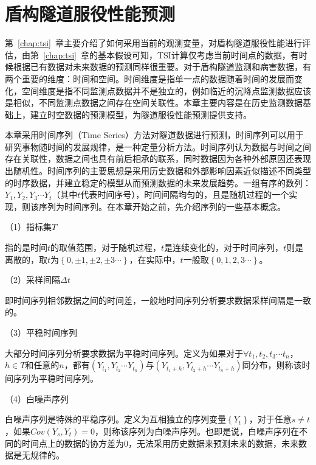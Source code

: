 \chapter{盾构隧道服役性能预测}
\label{chap:prediction}

第~\ref{chap:tsi}~章主要介绍了如何采用当前的观测变量，对盾构隧道服役性能进行评估，由第~\ref{chap:tsi}~章的基本假设可知，TSI计算仅考虑当前时间点的数据，有时候根据已有数据对未来数据的预测同样很重要。对于盾构隧道监测和病害数据，有两个重要的维度：时间和空间。时间维度是指单一点的数据随着时间的发展而变化，空间维度是指不同监测点数据并不是独立的，例如临近的沉降点监测数据应该是相似，不同监测点数据之间存在空间关联性。本章主要内容是在历史监测数据基础上，建立时空数据的预测模型，为隧道服役性能预测提供支持。

本章采用时间序列（Time Series）方法对隧道数据进行预测，时间序列可以用于研究事物随时间的发展规律，是一种定量分析方法。时间序列认为数据与时间之间存在关联性，数据之间也具有前后相承的联系，同时数据因为各种外部原因还表现出随机性。时间序列的主要思想是采用历史数据和外部影响因素近似描述不同类型的时序数据，并建立稳定的模型从而预测数据的未来发展趋势。一组有序的数列：${{Y}_{1}},{{Y}_{2}},{{Y}_{3}}\cdots {{Y}_{t}}$（其中$t$代表时间序号），时间间隔均匀的，且是随机过程的一个实现，则该序列为时间序列。在本章开始之前，先介绍序列的一些基本概念。

（1）指标集$T$

指的是时间$t$的取值范围，对于随机过程，$t$是连续变化的，对于时间序列，$t$则是离散的，取$t$为$\left\{ 0,\pm 1,\pm 2,\pm 3\cdots  \right\}$，在实际中，$t$一般取$\left\{ 0,1,2,3\cdots  \right\}$。

（2）采样间隔$\Delta t$

即时间序列相邻数据之间的时间差，一般地时间序列分析要求数据采样间隔是一致的。

（3）平稳时间序列

大部分时间序列分析要求数据为平稳时间序列。定义为如果对于$\forall {{t}_{1}},{{t}_{2}},{{t}_{3}}\cdots {{t}_{n}}$，$h\in T$和任意的$n$，都有$\left( {{Y}_{{{t}_{1}}}},{{Y}_{{{t}_{2}}}}\cdots {{Y}_{{{t}_{n}}}} \right)$与$\left( {{Y}_{{{t}_{1}}+h}},{{Y}_{{{t}_{2}}+h}}\cdots {{Y}_{{{t}_{n}}+h}} \right)$同分布，则称该时间序列为平稳时间序列。

（4）白噪声序列

白噪声序列是特殊的平稳序列。定义为互相独立的序列变量$\left\{ {{Y}_{t}} \right\}$，对于任意$s\ne t$，如果$Cov({{Y}_{s}},{{Y}_{t}})=0$，则称该序列为白噪声序列。也即是说，白噪声序列在不同的时间点上的数据的协方差为0，无法采用历史数据来预测未来的数据，未来数据是无规律的。

